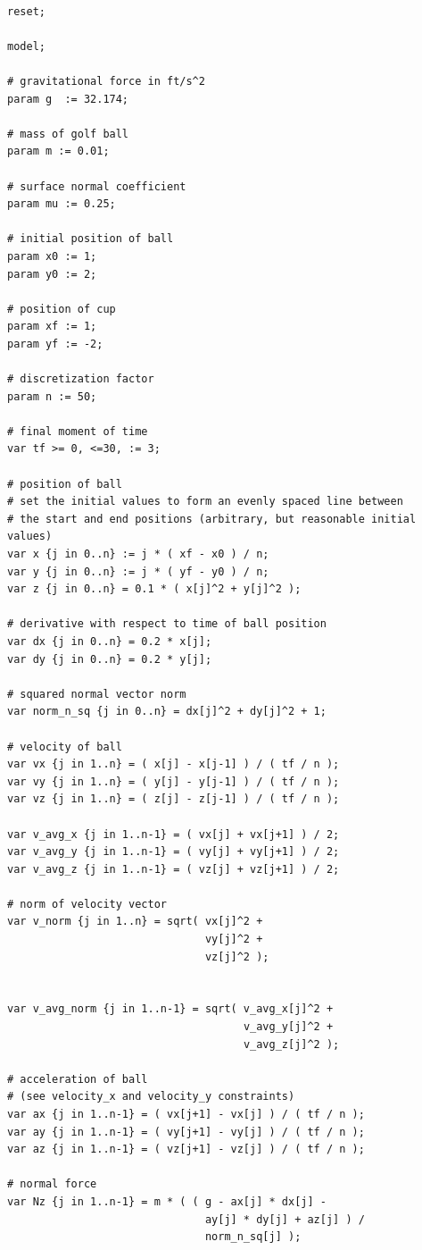 \documentclass{article}
\begin{document}
\begin{verbatim}

reset;

model;

# gravitational force in ft/s^2 
param g  := 32.174;

# mass of golf ball
param m := 0.01;

# surface normal coefficient
param mu := 0.25;

# initial position of ball
param x0 := 1;
param y0 := 2;

# position of cup
param xf := 1;
param yf := -2;

# discretization factor
param n := 50;

# final moment of time
var tf >= 0, <=30, := 3;

# position of ball
# set the initial values to form an evenly spaced line between
# the start and end positions (arbitrary, but reasonable initial values)
var x {j in 0..n} := j * ( xf - x0 ) / n;
var y {j in 0..n} := j * ( yf - y0 ) / n;
var z {j in 0..n} = 0.1 * ( x[j]^2 + y[j]^2 );

# derivative with respect to time of ball position
var dx {j in 0..n} = 0.2 * x[j];
var dy {j in 0..n} = 0.2 * y[j];

# squared normal vector norm
var norm_n_sq {j in 0..n} = dx[j]^2 + dy[j]^2 + 1;

# velocity of ball
var vx {j in 1..n} = ( x[j] - x[j-1] ) / ( tf / n );
var vy {j in 1..n} = ( y[j] - y[j-1] ) / ( tf / n );
var vz {j in 1..n} = ( z[j] - z[j-1] ) / ( tf / n );

var v_avg_x {j in 1..n-1} = ( vx[j] + vx[j+1] ) / 2;
var v_avg_y {j in 1..n-1} = ( vy[j] + vy[j+1] ) / 2;
var v_avg_z {j in 1..n-1} = ( vz[j] + vz[j+1] ) / 2;

# norm of velocity vector
var v_norm {j in 1..n} = sqrt( vx[j]^2 +
                               vy[j]^2 +
                               vz[j]^2 );


var v_avg_norm {j in 1..n-1} = sqrt( v_avg_x[j]^2 +
                                     v_avg_y[j]^2 +
                                     v_avg_z[j]^2 );

# acceleration of ball
# (see velocity_x and velocity_y constraints)
var ax {j in 1..n-1} = ( vx[j+1] - vx[j] ) / ( tf / n );
var ay {j in 1..n-1} = ( vy[j+1] - vy[j] ) / ( tf / n );
var az {j in 1..n-1} = ( vz[j+1] - vz[j] ) / ( tf / n );

# normal force
var Nz {j in 1..n-1} = m * ( ( g - ax[j] * dx[j] -
                               ay[j] * dy[j] + az[j] ) /
                               norm_n_sq[j] );


\end{verbatim}
\end{document}
